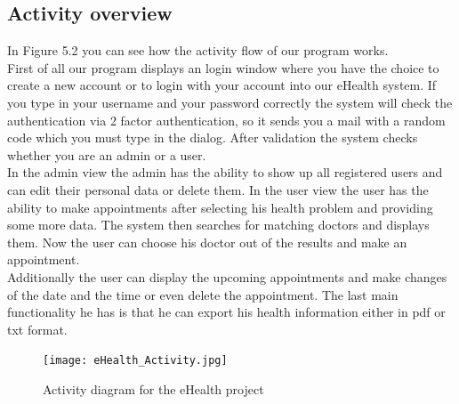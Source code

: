 \documentclass[a4paper, 12pt]{report}
\begin{document}
\subsection{Activity overview} 
In Figure 5.2 you can see how the activity flow of our program works.\\
First of all our program displays an login window where you have the choice to create a new account or to login with your account into our eHealth system. If you type in your username and your password correctly the system will check the authentication via 2 factor authentication, so it sends you a mail with a random code which you must type in the dialog. After validation the system checks whether you are an admin or a user.\\
In the admin view the admin has the ability to show up all registered users and can edit their personal data or delete them.
In the user view the user has the ability to make appointments after selecting his health problem and providing some more data. The system then searches for matching doctors and displays them. Now the user can choose his doctor out of the results and make an appointment.\\
Additionally the user can display the upcoming appointments and make changes of the date and the time or even delete the appointment.
The last main functionality he has is that he can export his health information either in pdf or txt format.


\begin{figure}
	\texttt{[image: eHealth\_Activity.jpg]}
	\caption{Activity diagram for the eHealth project}
\end{figure}
\end{document}
